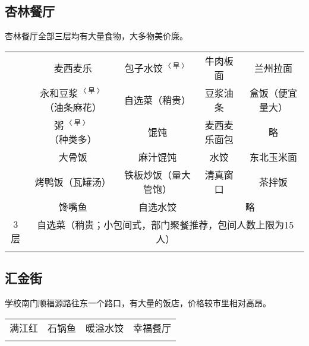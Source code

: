 \subsection[杏林餐厅]{杏林餐厅}
杏林餐厅全部三层均有大量食物，大多物美价廉。

\newpage
\begin{table*}[ht]
    \centering
    \begin{tabular}{c|c|c|c|c|}
        \Xhline{1.2pt}
        \multirow{3}{*}{1层} & 麦西麦乐                                                & 包子水饺$^{〈早〉}$ & 牛肉板面                   & 兰州拉面     \\
        \cline{2-5}
                            & 永和豆浆$^{〈早〉}$（油条麻花）                                  & 自选菜（稍贵）      & 豆浆油条                   & 盒饭（便宜量大） \\
        \cline{2-5}
                            & 粥$^{〈早〉}$（种类多）                                      & 馄饨           & 麦西麦乐面包                 & 略        \\
        \Xhline{1.2pt}
        \multirow{3}{*}{2层} & 大骨饭                                                 & 麻汁馄饨         & 水饺                     & 东北玉米面    \\
        \cline{2-5}
                            & 烤鸭饭（瓦罐汤）                                            & 铁板炒饭（量大管饱）   & 清真窗口                   & 茶拌饭      \\
        \cline{2-5}
                            & 馋嘴鱼                                                 & 自选水饺         & \multicolumn{2}{c|}{略}            \\
        \Xhline{1.2pt}
        3层\footnotemark     & \multicolumn{4}{c|}{自选菜（稍贵；小包间式，部门聚餐推荐，包间人数上限为15人）}                                                    \\
        \Xhline{1.2pt}
    \end{tabular}
\end{table*}

\subsection[汇金街]{汇金街}
学校南门顺福源路往东一个路口，有大量的饭店，价格较市里相对高昂。
\begin{table*}[ht]
    \centering
    \begin{tabular}{|c|c|c|c|}
        \Xhline{1.2pt}
        满江红 & 石锅鱼 & 暖溢水饺 & 幸福餐厅 \\
        \Xhline{1.2pt}
    \end{tabular}
\end{table*}


